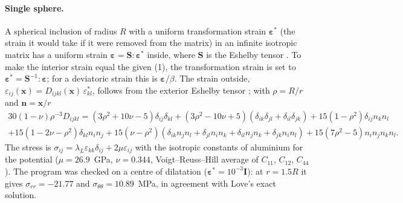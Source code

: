 \documentclass[11pt,a4paper]{article}
\begin{document}
\paragraph{Single sphere.} A spherical inclusion of radius $R$ with a uniform
transformation strain $\boldsymbol\varepsilon^*$ (the strain it would take if
it were removed from the matrix) in an infinite isotropic matrix
has a uniform strain $\boldsymbol\varepsilon=\mathbf S:\boldsymbol\varepsilon^*$
inside, where $\mathbf S$ is the Eshelby tensor \cite{Eshelby1957,Mura1987}. To
make the interior strain equal the given (1), the transformation strain is set to
$\boldsymbol\varepsilon^*=\mathbf S^{-1}:\boldsymbol\varepsilon$; for a
deviatoric strain this is $\boldsymbol\varepsilon/\beta$. The strain outside,
$\varepsilon_{ij}(\mathbf x)=D_{ijkl}(\mathbf x)\,\varepsilon^*_{kl}$, follows
from the exterior Eshelby tensor \cite{JuSun1999}; with $\rho=R/r$ and
$\mathbf n=\mathbf x/r$
\begin{multline}
30(1-\nu)\rho^{-3}D_{ijkl}=(3\rho^2+10\nu-5)\delta_{ij}\delta_{kl}
+(3\rho^2-10\nu+5)(\delta_{ik}\delta_{jl}+\delta_{il}\delta_{jk})
+15(1-\rho^2)\delta_{ij}n_kn_l\\
+15(1-2\nu-\rho^2)\delta_{kl}n_in_j
+15(\nu-\rho^2)(\delta_{ik}n_jn_l+\delta_{jl}n_in_k+\delta_{il}n_jn_k+\delta_{jk}n_in_l)
+15(7\rho^2-5)n_in_jn_kn_l .
\end{multline}
The stress is $\sigma_{ij}=\lambda_L\varepsilon_{kk}\delta_{ij}+2\mu\varepsilon_{ij}$
with the isotropic constants of aluminium for the potential ($\mu=26.9$~GPa,
$\nu=0.344$, Voigt--Reuss--Hill average of $C_{11}$, $C_{12}$, $C_{44}$). The
program was checked on a centre of dilatation
($\boldsymbol\varepsilon^*=10^{-3}\mathbf I$): at $r=1.5R$ it gives
$\sigma_{rr}=-21.77$ and $\sigma_{\theta\theta}=10.89$~MPa, in agreement with Love's exact
solution.
\end{document}
